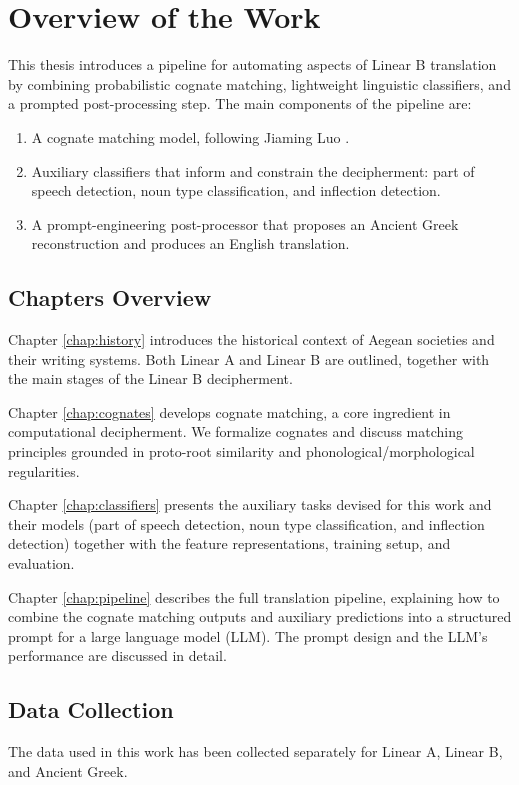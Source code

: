 \chapter{Overview of the Work}
This thesis introduces a pipeline for automating aspects of Linear B translation by combining probabilistic cognate matching, lightweight linguistic classifiers, and a prompted post-processing step.
The main components of the pipeline are:
\begin{enumerate}
    \item A cognate matching model, following Jiaming Luo \cite{luo}.
    \item Auxiliary classifiers that inform and constrain the decipherment: part of speech detection, noun type classification, and inflection detection.
    \item A prompt-engineering post-processor that proposes an Ancient Greek reconstruction and produces an English translation.
\end{enumerate}

\section{Chapters Overview}
Chapter \ref{chap:history} introduces the historical context of Aegean societies and their writing systems. Both Linear A and Linear B are outlined, together with the main stages of the Linear B decipherment.

Chapter \ref{chap:cognates} develops cognate matching, a core ingredient in computational decipherment. We formalize cognates and discuss matching principles grounded in proto-root similarity and phonological/morphological regularities.

Chapter \ref{chap:classifiers} presents the auxiliary tasks devised for this work and their models (part of speech detection, noun type classification, and inflection detection) together with the feature representations, training setup, and evaluation.

Chapter \ref{chap:pipeline} describes the full translation pipeline, explaining how to combine the cognate matching outputs and auxiliary predictions into a structured prompt for a large language model (LLM). The prompt design and the LLM's performance are discussed in detail.

\section{Data Collection}
The data used in this work has been collected separately for Linear A, Linear B, and Ancient Greek.


